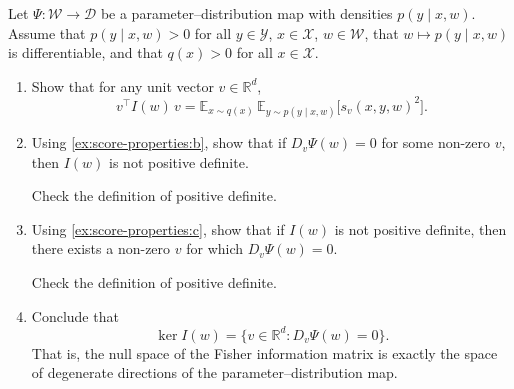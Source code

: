 \documentclass[11pt]{article}
\newcommand{\R}{\mathbb{R}}
\newcommand{\E}{\mathbb{E}}
\newcommand{\X}{\mathcal{X}}
\newcommand{\Y}{\mathcal{Y}}
\newcommand{\W}{\mathcal{W}}
\newcommand{\D}{\mathcal{D}}
\begin{document}
\begin{exercise}
\label{ex:fim-degeneracy}
    Let $\Psi : \W \to \D$ be a parameter--distribution map with densities
    $p(y \mid x, w)$. Assume that $p(y \mid x, w) > 0$ for all
    $y \in \Y$, $x \in \X$, $w \in \W$, that $w \mapsto p(y \mid x, w)$
    is differentiable, and that $q(x) > 0$ for all $x \in \X$.
\begin{enumerate}
    \item \label{ex:fim-degeneracy:a}
        Show that for any unit vector $v \in \R^d$,
        \begin{equation}\label{eq:fim-quadratic}
            v^\top I(w)\, v
            = \E_{x \sim q(x)}\,
              \E_{y \sim p(y \mid x, w)}\!\bigl[
                s_v(x, y, w)^2
              \bigr].
        \end{equation}
    \item
        Using \cref{ex:score-properties:b}, show that if $D_v \Psi(w) = 0$
        for some non-zero $v$, then $I(w)$ is not positive definite.
        \begin{hint}
Check the definition of positive definite.
        \end{hint}
    \item
        Using \cref{ex:score-properties:c}, show that if $I(w)$ is not
        positive definite, then there exists a non-zero $v$ for which
        $D_v \Psi(w) = 0$.
        \begin{hint}
Check the definition of positive definite.
        \end{hint}
    \item
        Conclude that
        \begin{equation}
            \ker I(w) = \bigl\{v \in \R^d : D_v \Psi(w) = 0\bigr\}.
        \end{equation}
        That is, the null space of the Fisher information matrix is
        exactly the space of degenerate directions of the
        parameter--distribution map.
\end{enumerate}
\end{exercise}
\end{document}
